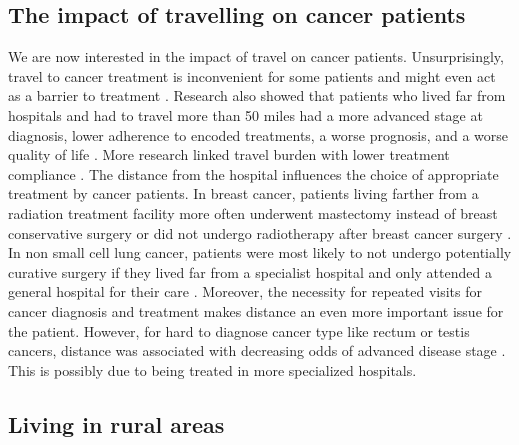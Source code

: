 \subsection{The impact of travelling on cancer patients}

We are now interested in the impact of travel on cancer patients.
Unsurprisingly, travel to cancer treatment is inconvenient for some patients and
might even act as a barrier to treatment \cite{payne_impact_2000}. Research also
showed that patients who lived far from hospitals and had to travel more than 50
miles had a more advanced stage at diagnosis, lower adherence to encoded
treatments, a worse prognosis, and a worse quality of life
\cite{ambroggi_distance_2015}. More research linked travel burden with lower
treatment compliance \cite{dutta_evaluation_2013,guidry_transportation_1997}.
The distance from the hospital influences the choice of appropriate treatment by
cancer patients. In breast cancer, patients living farther from a radiation
treatment facility more often underwent mastectomy instead of breast
conservative surgery
\cite{schroen_impact_2005,celaya_travel_2006,voti_treatment_2006,meden_relationship_2002,nattinger_relationship_2001,boscoe_geographic_2011}
or did not undergo radiotherapy after breast cancer surgery
\cite{satasivam_dilemma_2014,schroen_impact_2005,celaya_travel_2006}. In non
small cell lung cancer, patients were most likely to not undergo potentially
curative surgery if they lived far from a specialist hospital and only attended
a general hospital for their care \cite{tracey_patients_2015}. Moreover, the
necessity for repeated visits for cancer diagnosis and treatment makes distance
an even more important issue for the patient\cite{guidry_transportation_1997}.
However, for hard to diagnose cancer type like rectum or testis cancers,
distance was associated with decreasing odds of advanced disease stage
\cite{virgilsen_travel_2019}. This is possibly due to being treated in more
specialized hospitals.

\subsection{Living in rural areas}

